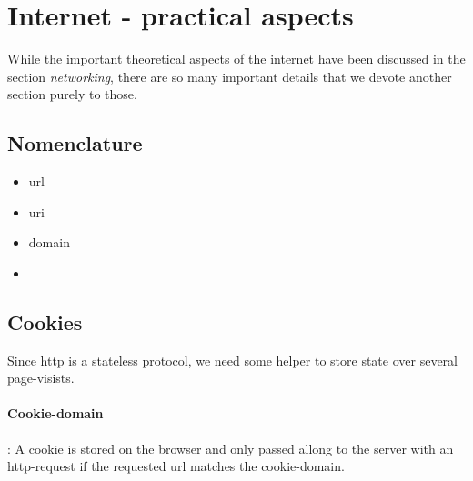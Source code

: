 \section{Internet - practical aspects}

While the important theoretical aspects of the internet have been discussed in the section \emph{networking}, there are so many important details that we devote another section purely to those. 

\subsection{Nomenclature}

\begin{itemize}
	\item url
	\item uri
	\item domain
	\item 
\end{itemize}


\subsection{Cookies}

Since http is a stateless protocol, we need some helper to store state over several page-visists. 

\paragraph{Cookie-domain}: A cookie is stored on the browser and only passed allong to the server with an http-request if the requested url matches the cookie-domain. 
